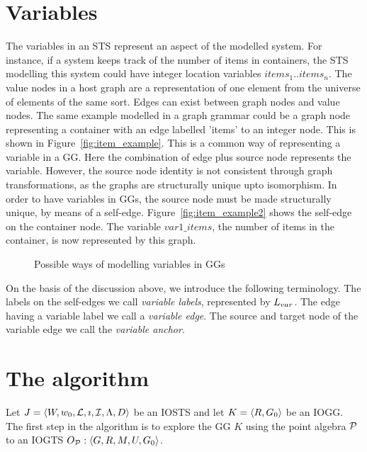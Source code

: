 \section{Variables}
The variables in an STS represent an aspect of the modelled system. For instance, if a system keeps track of the number of items in containers, the STS modelling this system could have integer location variables $\mathit{items}_1..\mathit{items}_n$. The value nodes in a host graph are a representation of one element from the universe of elements of the same sort. Edges can exist between graph nodes and value nodes. The same example modelled in a graph grammar could be a graph node representing a container with an edge labelled 'items' to an integer node. This is shown in Figure~\ref{fig:item_example}. This is a common way of representing a variable in a GG. Here the combination of edge plus source node represents the variable. However, the source node identity is not consistent through graph transformations, as the graphs are structurally unique upto isomorphism. In order to have variables in GGs, the source node must be made structurally unique, by means of a self-edge. Figure~\ref{fig:item_example2} shows the self-edge on the container node. The variable $\mathit{var1\_items}$, the number of items in the container, is now represented by this graph.

\begin{figure}[ht]
  \begin{center}
  \end{center}
  \caption{Possible ways of modelling variables in GGs}
  \label{fig:vars-in-ggs}
\end{figure}

On the basis of the discussion above, we introduce the following terminology. The labels on the self-edges we call \textit{variable labels}, represented by $L_{var}$. The edge having a variable label we call a \textit{variable edge}. The source and target node of the variable edge we call the \textit{variable anchor}.

\section{The algorithm}
Let $J = \langle W,w_0,\mathcal{L},\imath,\mathcal{I},\Lambda,D\rangle$ be an IOSTS and let $K = \langle R, G_0 \rangle$ be an IOGG. The first step in the algorithm is to explore the GG $K$ using the point algebra $\mathcal{P}$ to an IOGTS $O_{\mathcal{P}}: \langle G, R, M, U, G_0 \rangle$.

